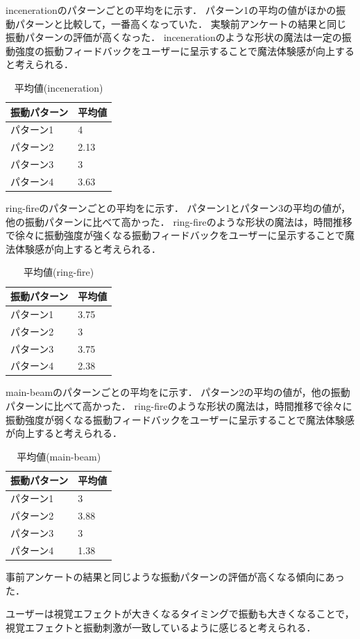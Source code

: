 incenerationのパターンごとの平均をに示す．
パターン1の平均の値がほかの振動パターンと比較して，一番高くなっていた．
実験前アンケートの結果と同じ振動パターンの評価が高くなった．
incenerationのような形状の魔法は一定の振動強度の振動フィードバックをユーザーに呈示することで魔法体験感が向上すると考えられる．

\begin{table}[h]
    \caption{平均値(inceneration)}
    \centering
    \begin{tabular}{l|l}
    \hline
    \hline
    振動パターン & 平均値\\
    \hline
    パターン1 & 4\\
    パターン2 & 2.13\\
    パターン3 & 3\\
    パターン4 & 3.63\\
    \hline
    \end{tabular}
    \label{tab;inceAvera}
\end{table}

ring-fireのパターンごとの平均をに示す．
パターン1とパターン3の平均の値が，他の振動パターンに比べて高かった．
ring-fireのような形状の魔法は，時間推移で徐々に振動強度が強くなる振動フィードバックをユーザーに呈示することで魔法体験感が向上すると考えられる．

\begin{table}[h]
    \caption{平均値(ring-fire)}
    \centering
    \begin{tabular}{l|l}
    \hline
    \hline
    振動パターン & 平均値\\
    \hline
    パターン1 & 3.75\\
    パターン2 & 3\\
    パターン3 & 3.75\\
    パターン4 & 2.38\\
    \hline
    \end{tabular}
    \label{tab;ringAve}
\end{table}

main-beamのパターンごとの平均をに示す．
パターン2の平均の値が，他の振動パターンに比べて高かった．
ring-fireのような形状の魔法は，時間推移で徐々に振動強度が弱くなる振動フィードバックをユーザーに呈示することで魔法体験感が向上すると考えられる．


  \begin{table}[H]
    \caption{平均値(main-beam)}
    \centering
    \begin{tabular}{l|l}
    \hline
    \hline
    振動パターン & 平均値\\
    \hline
    パターン1 & 3\\
    パターン2 & 3.88\\
    パターン3 & 3\\
    パターン4 & 1.38\\
    \hline
    \end{tabular}
    \label{tab;mainAve}
\end{table}

事前アンケートの結果と同じような振動パターンの評価が高くなる傾向にあった．

ユーザーは視覚エフェクトが大きくなるタイミングで振動も大きくなることで，視覚エフェクトと振動刺激が一致しているように感じると考えられる．


